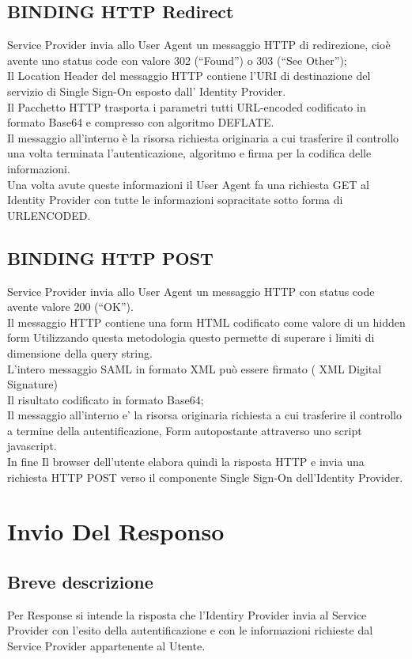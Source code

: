 \subsection{BINDING HTTP Redirect}
Service Provider invia allo User Agent un messaggio HTTP di redirezione, cioè avente uno status code con
valore 302 (“Found”) o 303 (“See Other”);
\\ Il Location Header del messaggio HTTP contiene l’URI di destinazione del servizio di Single
Sign-On esposto dall’ Identity Provider.
\\ Il Pacchetto HTTP trasporta i parametri tutti URL-encoded codificato in formato
Base64 e compresso con algoritmo DEFLATE.
\\ Il messaggio all'interno è la risorsa richiesta originaria a cui 
trasferire il controllo una volta terminata l'autenticazione, 
algoritmo e firma per la codifica delle informazioni.
\\ Una volta avute queste informazioni il User Agent fa una 
richiesta GET al Identity Provider con tutte le informazioni 
sopracitate sotto forma di URLENCODED.

\subsection{BINDING HTTP POST}
Service Provider invia allo User Agent un messaggio HTTP con
status code avente valore 200 (“OK”).
\\ Il messaggio HTTP contiene una form HTML codificato come valore di un hidden form
Utilizzando questa metodologia questo permette
di superare i limiti di dimensione della query string.
\\ L’intero messaggio SAML in
formato XML può essere firmato ( XML Digital Signature) 
\\ Il risultato codificato in formato Base64;
\\ Il messaggio all'interno e' la risorsa originaria richiesta 
a cui trasferire il controllo a termine della autentificazione,
Form autopostante attraverso uno script javascript. 
\\ In fine Il browser dell’utente 
elabora quindi la risposta HTTP e invia una richiesta HTTP POST
verso il componente Single Sign-On dell’Identity Provider.

\section{Invio Del Responso}
\subsection{Breve descrizione}
Per Response si intende la risposta che l'Identiry Provider invia al Service Provider con 
l'esito della autentificazione e con le informazioni richieste dal Service Provider appartenente al Utente.
